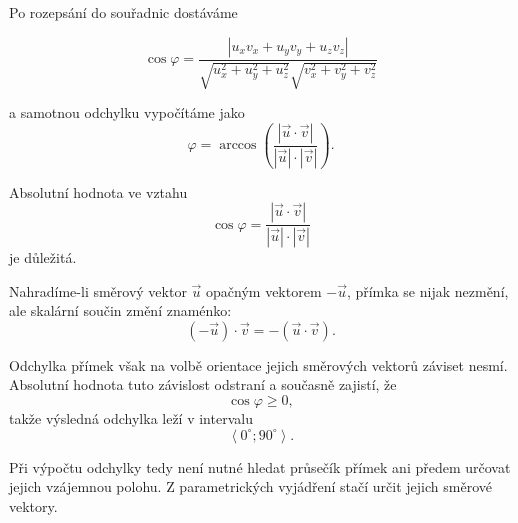 Po rozepsání do souřadnic dostáváme

\begin{equation}
    \cos\varphi
    =
    \frac{
        \left|
            u_xv_x+u_yv_y+u_zv_z
        \right|
    }{
        \sqrt{u_x^2+u_y^2+u_z^2}
        \sqrt{v_x^2+v_y^2+v_z^2}
    }
    \label{eq:Angle_between_lines_space_coordinates}
\end{equation}

a samotnou odchylku vypočítáme jako
\[
    \varphi
    =
    \arccos
    \left(
        \frac{
            \left|\vec{u}\cdot\vec{v}\right|
        }{
            |\vec{u}|\cdot|\vec{v}|
        }
    \right).
\]

\begin{remark}
    \label{rem:Absolute_value_angle_lines_space}
    Absolutní hodnota ve vztahu
    \[
        \cos\varphi
        =
        \frac{|\vec{u}\cdot\vec{v}|}
             {|\vec{u}|\cdot|\vec{v}|}
    \]
    je důležitá.

    Nahradíme-li směrový vektor $\vec{u}$ opačným vektorem
    $-\vec{u}$, přímka se nijak nezmění, ale skalární součin změní
    znaménko:
    \[
        (-\vec{u})\cdot\vec{v}
        =
        -(\vec{u}\cdot\vec{v}).
    \]

    Odchylka přímek však na volbě orientace jejich směrových vektorů
    záviset nesmí. Absolutní hodnota tuto závislost odstraní a současně
    zajistí, že
    \[
        \cos\varphi\geq0,
    \]
    takže výsledná odchylka leží v intervalu
    \[
        \left\langle0^\circ;90^\circ\right\rangle.
    \]
\end{remark}

Při výpočtu odchylky tedy není nutné hledat průsečík přímek ani
předem určovat jejich vzájemnou polohu. Z parametrických vyjádření
stačí určit jejich směrové vektory.

